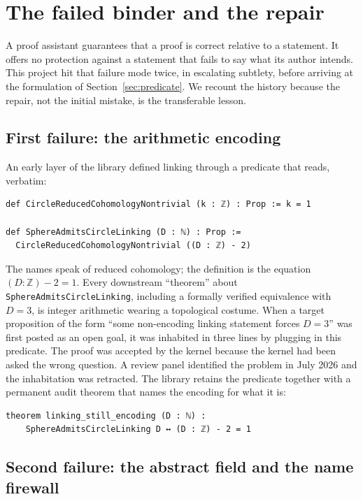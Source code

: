\documentclass[11pt]{article}
\theoremstyle{definition}
\newcommand{\Z}{\mathbb{Z}}
\newcommand{\lean}[1]{\texttt{#1}}
\begin{document}
\section{The failed binder and the repair}
\label{sec:binder}

A proof assistant guarantees that a proof is correct relative to a statement. It offers no protection against a statement that fails to say what its author intends. This project hit that failure mode twice, in escalating subtlety, before arriving at the formulation of Section~\ref{sec:predicate}. We recount the history because the repair, not the initial mistake, is the transferable lesson.

\subsection{First failure: the arithmetic encoding}

An early layer of the library defined linking through a predicate that reads, verbatim:

\begin{lstlisting}
def CircleReducedCohomologyNontrivial (k : ℤ) : Prop := k = 1

def SphereAdmitsCircleLinking (D : ℕ) : Prop :=
  CircleReducedCohomologyNontrivial ((D : ℤ) - 2)
\end{lstlisting}

The names speak of reduced cohomology; the definition is the equation $(D:\Z) - 2 = 1$. Every downstream ``theorem'' about \lean{SphereAdmitsCircleLinking}, including a formally verified equivalence with $D = 3$, is integer arithmetic wearing a topological costume. When a target proposition of the form ``some non-encoding linking statement forces $D=3$'' was first posted as an open goal, it was inhabited in three lines by plugging in this predicate. The proof was accepted by the kernel because the kernel had been asked the wrong question. A review panel identified the problem in July 2026 and the inhabitation was retracted. The library retains the predicate together with a permanent audit theorem that names the encoding for what it is:

\begin{lstlisting}
theorem linking_still_encoding (D : ℕ) :
    SphereAdmitsCircleLinking D ↔ (D : ℤ) - 2 = 1
\end{lstlisting}

\subsection{Second failure: the abstract field and the name firewall}
\end{document}
